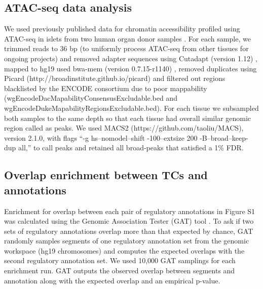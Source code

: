 \subsection{ATAC-seq data analysis}
We used previously published data for chromatin accessibility profiled using ATAC-seq in islets from two human organ donor samples \cite{varshneyGeneticRegulatorySignatures2017}. For each sample, we trimmed reads to 36 bp (to uniformly process ATAC-seq from other tissues for ongoing projects) and removed adapter sequences using Cutadapt (version 1.12) \cite{martinCutadaptRemovesAdapter2011}, mapped to hg19 used bwa-mem (version 0.7.15-r1140) \cite{liAligningSequenceReads2013}, removed duplicates using Picard (http://broadinstitute.github.io/picard) and filtered out regions blacklisted by the ENCODE consortium due to poor mappability (wgEncodeDacMapabilityConsensusExcludable.bed and wgEncodeDukeMapabilityRegionsExcludable.bed). For each tissue we subsampled both samples to the same depth so that each tissue had overall similar genomic region called as peaks. We used MACS2 (https://github.com/taoliu/MACS), version 2.1.0, with flags “-g hs–nomodel–shift -100–extsize 200 -B–broad–keep-dup all,” to call peaks and retained all broad-peaks that satisfied a 1\% FDR.
        
\subsection{Overlap enrichment between TCs and annotations}
Enrichment for overlap between each pair of regulatory annotations in Figure S1 was calculated using the Genomic Association Tester (GAT) tool \cite{hegerGATSimulationFramework2013}. To ask if two sets of regulatory annotations overlap more than that expected by chance, GAT randomly samples segments of one regulatory annotation set from the genomic workspace (hg19 chromosomes) and computes the expected overlaps with the second regulatory annotation set. We used 10,000 GAT samplings for each enrichment run. GAT outputs the observed overlap between segments and annotation along with the expected overlap and an empirical p-value.


